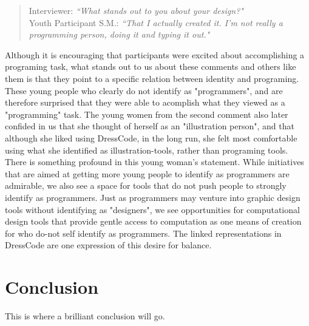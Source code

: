 \documentclass{sigchi}
\begin{document}
 \begin{quotation}
 Interviewer:  \textit{``What stands out to you about your design?"}
 \\Youth Participant S.M.: \textit{``That I actually created it. I'm not really a programming person, doing it and typing it out."}
 \end{quotation}

Although it is encouraging that participants were excited about accomplishing a programing task, what stands out to us about these comments and others like them is that they point to a specific relation between identity and programing. These young people who clearly do not identify as "programmers", and are therefore surprised that they were able to acomplish what they viewed as a "programming" task. The young women from the second comment also later confided in us that she thought of herself as an "illustration person", and that although she liked using DressCode, in the long run, she felt most comfortable using what she identified as illustration-tools, rather than programing tools. 
There is something profound in this young woman's statement. While initiatives that are aimed at getting more young people to identify as programmers are admirable, we also see a space for tools that do not push people to strongly identify as programmers. Just as programmers may venture into graphic design tools without identifying as "designers", we see opportunities for computational design tools that provide gentle access to computation as one means of creation for who do-not self identify as programmers. The linked representations in DressCode are one expression of this desire for balance.

\section{Conclusion}
This is where a brilliant conclusion will go.



\end{document}
